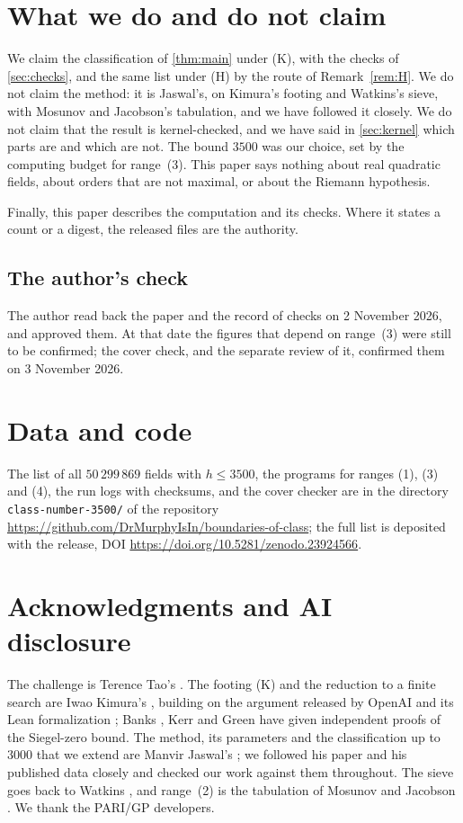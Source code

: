 \documentclass[11pt]{article}
\theoremstyle{definition}
\begin{document}
\section{What we do and do not claim}\label{sec:claims}

We claim the classification of \cref{thm:main} under (K), with the checks of \cref{sec:checks}, and the same list under
(H) by the route of Remark~\ref{rem:H}. We do not claim the method: it is Jaswal's, on Kimura's footing and Watkins's
sieve, with Mosunov and Jacobson's tabulation, and we have followed it closely. We do not claim that the result is
kernel-checked, and we have said in \cref{sec:kernel} which parts are and which are not. The bound $3500$ was our
choice, set by the computing budget for range~(3). This paper says nothing about real quadratic fields, about orders that
are not maximal, or about the Riemann hypothesis.

Finally, this paper describes the computation and its checks. Where it states a count or a digest, the released files are
the authority.

\subsection*{The author's check}
The author read back the paper and the record of checks on 2 November 2026, and approved them. At that date the figures that depend
on range~(3) were still to be confirmed; the cover check, and the separate review of it, confirmed them on 3 November
2026.

\section*{Data and code}
The list of all $50\,299\,869$ fields with $h \le 3500$, the programs for ranges (1), (3) and (4), the run logs with
checksums, and the cover checker are in the directory \texttt{class-number-3500/} of the repository \url{https://github.com/DrMurphyIsIn/boundaries-of-class}; the full list is deposited with the release, DOI \url{https://doi.org/10.5281/zenodo.23924566}.

\section*{Acknowledgments and AI disclosure}
The challenge is Terence Tao's \cite{TaoChallenge}. The footing (K) and the reduction to a finite search are Iwao
Kimura's \cite{Kimura2026}, building on the argument released by OpenAI \cite{OpenAISZ} and its Lean formalization \cite{OpenAIRepo}; Banks
\cite{Banks2026}, Kerr \cite{Kerr2026} and Green \cite{Green2026} have given independent proofs of the Siegel-zero bound. The method, its parameters and the
classification up to $3000$ that we extend are Manvir Jaswal's \cite{Jaswal2026}; we followed his paper and his published
data closely and checked our work against them throughout. The sieve goes back to Watkins \cite{Watkins2004}, and range~(2)
is the tabulation of Mosunov and Jacobson \cite{MJ16}. We thank the PARI/GP developers.
\end{document}
